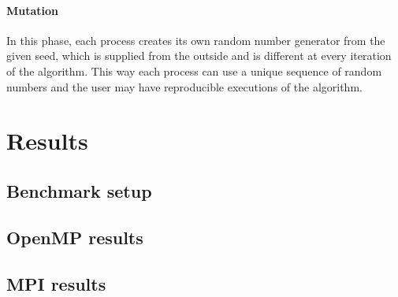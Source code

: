 \documentclass[12pt,a4paper,oneside]{article}
\begin{document}
	\paragraph{Mutation}
	In this phase, each process creates its own random number generator from the given seed, which is supplied from the outside and is different at every iteration of the algorithm.
	This way each process can use a unique sequence of random numbers and the user may have reproducible executions of the algorithm.
	
	\clearpage
	\section{Results}
	\subsection{Benchmark setup}
	\subsection{OpenMP results}
	\subsection{MPI results}
\end{document}
